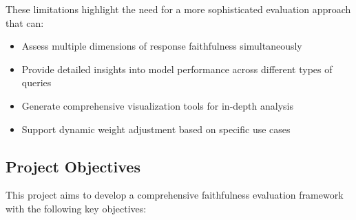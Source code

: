 These limitations highlight the need for a more sophisticated evaluation approach that can:
\begin{itemize}
    \item Assess multiple dimensions of response faithfulness simultaneously
    \item Provide detailed insights into model performance across different types of queries
    \item Generate comprehensive visualization tools for in-depth analysis
    \item Support dynamic weight adjustment based on specific use cases
\end{itemize}

\subsection{Project Objectives}
This project aims to develop a comprehensive faithfulness evaluation framework with the following key objectives:

